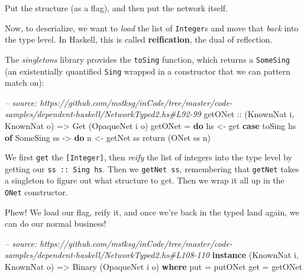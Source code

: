 \documentclass[]{article}
\newenvironment{Shaded}{}{}
\newcommand{\KeywordTok}[1]{\textcolor[rgb]{0.00,0.44,0.13}{\textbf{{#1}}}}
\newcommand{\DataTypeTok}[1]{\textcolor[rgb]{0.56,0.13,0.00}{{#1}}}
\newcommand{\CommentTok}[1]{\textcolor[rgb]{0.38,0.63,0.69}{\textit{{#1}}}}
\newcommand{\OtherTok}[1]{\textcolor[rgb]{0.00,0.44,0.13}{{#1}}}
\newcommand{\FunctionTok}[1]{\textcolor[rgb]{0.02,0.16,0.49}{{#1}}}
\newcommand{\NormalTok}[1]{{#1}}
\begin{document}
Put the structure (as a flag), and then put the network itself.

Now, to deserialize, we want to \emph{load} the list of \texttt{Integer}s and
move that \emph{back} into the type level. In Haskell, this is called
\textbf{reification}, the dual of reflection.

The \emph{singletons} library provides the \texttt{toSing} function, which
returns a \texttt{SomeSing} (an existentially quantified \texttt{Sing} wrapped
in a constructor that we can pattern match on):

\begin{Shaded}
\begin{Highlighting}[]
\CommentTok{-- source: https://github.com/mstksg/inCode/tree/master/code-samples/dependent-haskell/NetworkTyped2.hs#L92-99}
\OtherTok{getONet ::} \NormalTok{(}\DataTypeTok{KnownNat} \NormalTok{i, }\DataTypeTok{KnownNat} \NormalTok{o)}
        \OtherTok{=>} \DataTypeTok{Get} \NormalTok{(}\DataTypeTok{OpaqueNet} \NormalTok{i o)}
\NormalTok{getONet }\FunctionTok{=} \KeywordTok{do}
    \NormalTok{hs }\OtherTok{<-} \NormalTok{get}
    \KeywordTok{case} \NormalTok{toSing hs }\KeywordTok{of}
      \DataTypeTok{SomeSing} \NormalTok{ss }\OtherTok{->} \KeywordTok{do}
        \NormalTok{n }\OtherTok{<-} \NormalTok{getNet ss}
        \NormalTok{return (}\DataTypeTok{ONet} \NormalTok{ss n)}
\end{Highlighting}
\end{Shaded}

We first \texttt{get} the \texttt{{[}Integer{]}}, then \emph{reify} the list of
integers into the type level by getting our \texttt{ss\ ::\ Sing\ hs}. Then we
\texttt{getNet\ ss}, remembering that \texttt{getNet} takes a singleton to
figure out what structure to get. Then we wrap it all up in the \texttt{ONet}
constructor.

Phew! We load our flag, reify it, and once we're back in the typed land again,
we can do our normal business!

\begin{Shaded}
\begin{Highlighting}[]
\CommentTok{-- source: https://github.com/mstksg/inCode/tree/master/code-samples/dependent-haskell/NetworkTyped2.hs#L108-110}
\KeywordTok{instance} \NormalTok{(}\DataTypeTok{KnownNat} \NormalTok{i, }\DataTypeTok{KnownNat} \NormalTok{o) }\OtherTok{=>} \DataTypeTok{Binary} \NormalTok{(}\DataTypeTok{OpaqueNet} \NormalTok{i o) }\KeywordTok{where}
    \NormalTok{put }\FunctionTok{=} \NormalTok{putONet}
    \NormalTok{get }\FunctionTok{=} \NormalTok{getONet}
\end{Highlighting}
\end{Shaded}
\end{document}

